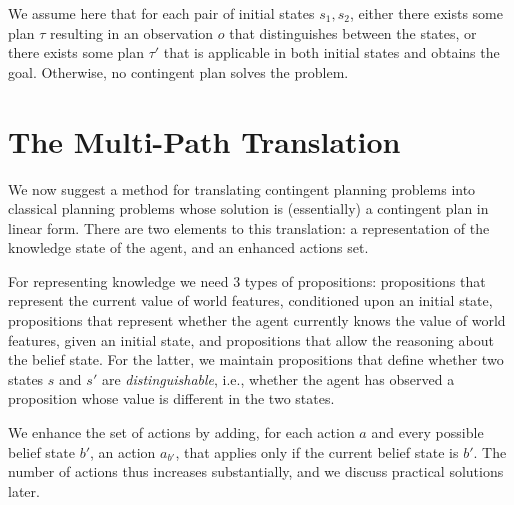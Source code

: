 \documentclass[letterpaper]{article}
\numberwithin{equation}{section}	%
\begin{document}
We assume here that for each pair of initial states $s_1,s_2$, either there exists some plan $\tau$ resulting in an observation $o$ that distinguishes between the states, or there exists some plan $\tau'$ that is applicable in both initial states and obtains the goal. Otherwise, no contingent plan solves the problem.


\section{The Multi-Path Translation}

We now suggest a method for translating contingent planning problems into classical planning problems whose
solution is (essentially) a contingent plan in linear form. There are two elements to this translation: a representation
of the knowledge state of the agent, and an enhanced actions set.

For representing knowledge we need 3 types of propositions: propositions that represent the current value of world features, conditioned upon an initial state, propositions that represent whether the agent currently knows the value of world features, given an initial state, and propositions that allow the reasoning about the belief state. For the latter, we maintain propositions that define whether two states $s$ and $s'$ are {\em distinguishable}, i.e., whether the agent has observed a proposition whose value is different in the two states.

We enhance the set of actions by adding, for each action $a$ and every possible belief state $b'$, an action
$a_{b'}$, that applies only if the current belief state is $b'$. The number of actions thus increases substantially, and we discuss practical solutions later.
\end{document}
